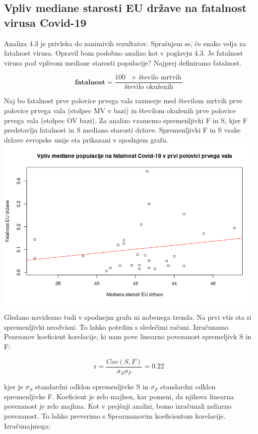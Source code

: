 \documentclass[a4paper,11pt]{article}
\begin{document}
\subsection{Vpliv mediane starosti EU države na fatalnost virusa Covid-19}
Analiza 4.3 je privleka do zanimivih rezultatov. Sprašujem se, če enako velja za fatalnost virusa. Opravil bom podobno analizo kot v poglavju 4.3. Je fatalnost virusa pod vplivom mediane starosti populacije? Najprej definiramo fatalnost.
\begin{center}
\[\textbf{fatalnost} = \frac{100 \text{ \(\times\) število mrtvih}}{\text{število okuženih}}\]
\end{center} 
Naj bo fatalnost prve polovice prvega vala razmerje med številom mrtvih prve polovice prvega vala (stolpec MV v bazi) in številom okuženih prve polovice prvega vala (stolpec OV bazi). Za analizo vzamemo spremenljivki F in S, kjer F predstavlja fatalnost in S mediano starosti države. Spremenljivki F in S vsake države evropske unije sta prikazani v spodnjem grafu.
\includegraphics[scale=0.6]{Vpliv_mediane_populacije_na_fatalnost_Covid-19_v_prvi_polovici_vala}

Gledano navidezno tudi v spodnejm grafu ni nobenega trenda. Na prvi vtis sta si spremenljivki neodvisni. To lahko potrdim s sledečimi računi. Izračunamo Pearsonov koeficient korelacije, ki nam pove linearno povezanost spremeljivk S in F:

\begin{center}
\[\text{r} = \frac{Cov(S,F)}{\sigma_{S} \sigma_{F}} = 0.22\]
\end{center} 
kjer je \(\sigma_{S}\) standardni odklon spremenljivke S in \(\sigma_{F}\) standardni odklon spremenljivke F. Koeficient je zelo majhen, kar pomeni, da njihova linearna povezanost je zelo majhna. Kot v prejšnji analizi, bomo izračunali neliarno povezanost. To lahko preverimo s Spearmanovim koeficientom korelacije. Izračunajmoga: 
\end{document}
